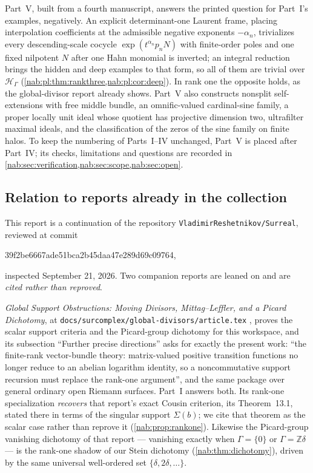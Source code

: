 \documentclass[11pt,letterpaper]{article}
\theoremstyle{definition}
\theoremstyle{remark}
\newcommand{\Z}{\mathbb Z}
\newcommand{\HH}{\mathscr H_\Gamma}
\numberwithin{equation}{section}
\begin{document}
Part~V, built from a fourth manuscript, answers the printed question for
Part~I's examples, negatively. An explicit determinant-one Laurent frame,
placing interpolation coefficients at the admissible negative exponents
$-\alpha_n$, trivializes every descending-scale cocycle
$\exp(t^{\alpha_n}p_nN)$ with finite-order poles and one fixed nilpotent $N$
after one Hahn monomial is inverted; an integral reduction brings the hidden
and deep examples to that form, so all of them are trivial over $\HH$
(\cref{nab:pl:thm:rankthree,nab:pl:cor:deep}). In rank one the opposite holds,
as the global-divisor report already shows. Part~V also constructs nonsplit
self-extensions with free middle bundle, an omnific-valued cardinal-sine
family, a proper locally unit ideal whose quotient has projective dimension
two, ultrafilter maximal ideals, and the classification of the zeros of the
sine family on finite halos. To keep the numbering of Parts~I--IV unchanged,
Part~V is placed after Part~IV; its checks, limitations and questions are
recorded in \cref{nab:sec:verification,nab:sec:scope,nab:sec:open}.

\subsection{Relation to reports already in the collection}

This report is a continuation of the repository
\texttt{VladimirReshetnikov/Surreal}, reviewed at commit
\begin{center}\small\ttfamily
39f2be6667ade51bca2b45daa47e289d69c09764,
\end{center}
inspected September 21, 2026. Two companion reports are leaned on and are
\emph{cited rather than reproved}.

\emph{Global Support Obstructions: Moving Divisors, Mittag--Leffler, and a
Picard Dichotomy}, at \texttt{docs/surcomplex/global-divisors/article.tex}
\cite{RepoGlobal}, proves the scalar support criteria and the Picard-group
dichotomy for this workspace, and its subsection ``Further precise
directions'' asks for exactly the present work: ``the finite-rank
vector-bundle theory: matrix-valued positive transition functions no longer
reduce to an abelian logarithm identity, so a noncommutative support
recursion must replace the rank-one argument'', and the same package over
general ordinary open Riemann surfaces. Part~I answers both. Its rank-one
specialization \emph{recovers} that report's exact Cousin criterion, its
Theorem~13.1, stated there in terms of the singular support $\Sigma(b)$; we
cite that theorem as the scalar case rather than reprove it
(\cref{nab:prop:rankone}). Likewise the Picard-group vanishing dichotomy of
that report --- vanishing exactly when $\Gamma=\{0\}$ or $\Gamma=\Z\delta$ ---
is the rank-one shadow of our Stein dichotomy
(\cref{nab:thm:dichotomy}), driven by the same universal well-ordered set
$\{\delta,2\delta,\ldots\}$.
\end{document}
